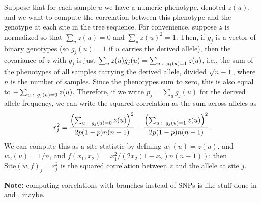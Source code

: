 \documentclass{article}
\newcommand{\site}{\mbox{Site}} %
\newcommand{\iw}{w} %
\begin{document}
\begin{example} \label{ex:site_correlations}
    Suppose that for each sample $u$ we have a numeric phenotype, denoted $z(u)$,
    and we want to compute the correlation between this phenotype
    and the genotype at each site in the tree sequence.
    For convenience, suppose $z$ is normalized so that $\sum_u z(u) = 0$ and $\sum_u z(u)^2 = 1$.
    Then, if $g_j$ is a vector of binary genotypes (so $g_j(u) = 1$ if $u$ carries the derived allele),
    then the covariance of $z$ with $g_j$ is just $\sum_u z(u) g_j(u) = \sum_{u \,\colon\, g_j(u) = 1} z(u)$,
    i.e., the sum of the phenotypes of all samples carrying the derived allele,
    divided $\sqrt{n - 1}$, where $n$ is the number of samples.
    Since the phenotypes sum to zero, this is also equal to 
    $- \sum_{u \,\colon\, g_j(u) = 0} z(u)$.
    Therefore, if we write $p_j = \sum_u g_j(u)$ for the derived allele frequency,
    we can write the squared correlation as the sum across alleles as
    \begin{align*}
        r_j^2 =
        \frac{\left( \sum_{u \,\colon\, g_j(u) = 0} z(u)\right)^2}{2p(1-p)n(n-1)} 
        + \frac{\left( \sum_{u \,\colon\, g_j(u) = 1} z(u)\right)^2}{2p(1-p)n(n-1)}  .
    \end{align*}
    We can compute this as a site statistic by defining $\iw_{1}(u) = z(u)$, and $\iw_{2}(u) = 1/n$,
    and $f(x_1, x_2) = x_1^2 / (2 x_2 (1 - x_2) n (n-1))$:
    then $\site(\iw, f)_j = r_j^2$ is the squared correlation between $z$ and the allele at site $j$.
\end{example}

\textbf{Note:} computing correlations with branches instead of SNPs is like stuff done in \citet{zollner2005coalescent} and \citet{minichiello2006mapping}, maybe.
\end{document}
